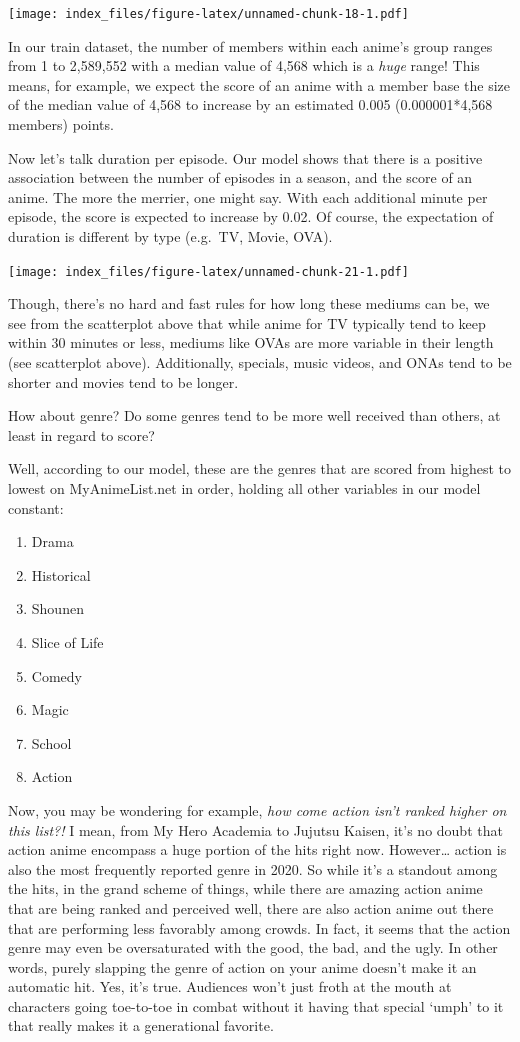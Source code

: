 \documentclass[
]{article}
\begin{document}
\texttt{[image: index\_files/figure-latex/unnamed-chunk-18-1.pdf]}

In our train dataset, the number of members within each anime's group
ranges from 1 to 2,589,552 with a median value of 4,568 which is a
\emph{huge} range! This means, for example, we expect the score of an
anime with a member base the size of the median value of 4,568 to
increase by an estimated 0.005 (0.000001*4,568 members) points.

Now let's talk duration per episode. Our model shows that there is a
positive association between the number of episodes in a season, and the
score of an anime. The more the merrier, one might say. With each
additional minute per episode, the score is expected to increase by
0.02. Of course, the expectation of duration is different by type
(e.g.~TV, Movie, OVA).

\texttt{[image: index\_files/figure-latex/unnamed-chunk-21-1.pdf]}

Though, there's no hard and fast rules for how long these mediums can
be, we see from the scatterplot above that while anime for TV typically
tend to keep within 30 minutes or less, mediums like OVAs are more
variable in their length (see scatterplot above). Additionally,
specials, music videos, and ONAs tend to be shorter and movies tend to
be longer.

How about genre? Do some genres tend to be more well received than
others, at least in regard to score?

Well, according to our model, these are the genres that are scored from
highest to lowest on MyAnimeList.net in order, holding all other
variables in our model constant:

\begin{enumerate}
\def\labelenumi{\arabic{enumi})}
\item
  Drama
\item
  Historical
\item
  Shounen
\item
  Slice of Life
\item
  Comedy
\item
  Magic
\item
  School
\item
  Action
\end{enumerate}

Now, you may be wondering for example,
\textit{how come action isn't ranked higher on this list?!} I mean, from
My Hero Academia to Jujutsu Kaisen, it's no doubt that action anime
encompass a huge portion of the hits right now. However\ldots{} action
is also the most frequently reported genre in 2020. So while it's a
standout among the hits, in the grand scheme of things, while there are
amazing action anime that are being ranked and perceived well, there are
also action anime out there that are performing less favorably among
crowds. In fact, it seems that the action genre may even be
oversaturated with the good, the bad, and the ugly. In other words,
purely slapping the genre of action on your anime doesn't make it an
automatic hit. Yes, it's true. Audiences won't just froth at the mouth
at characters going toe-to-toe in combat without it having that special
`umph' to it that really makes it a generational favorite.
\end{document}
